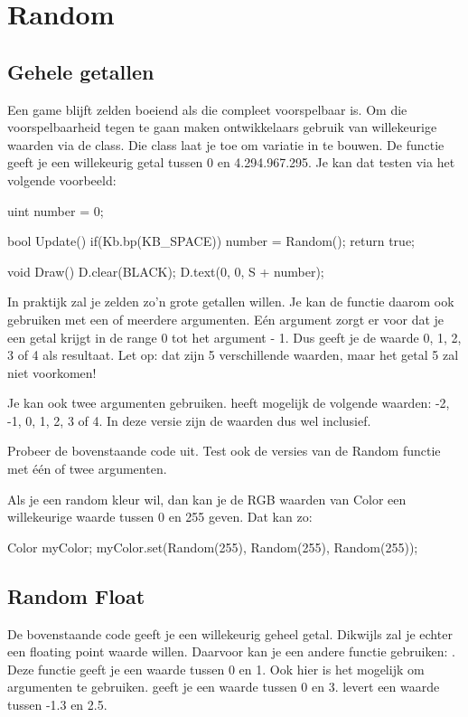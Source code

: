 \chapter{Random}

\section{Gehele getallen}
Een game blijft zelden boeiend als die compleet voorspelbaar is. Om die voorspelbaarheid tegen te gaan maken ontwikkelaars gebruik van willekeurige waarden via de  class. Die class laat je toe om variatie in te bouwen. De functie  geeft je een willekeurig getal tussen 0 en 4.294.967.295. Je kan dat testen via het volgende voorbeeld:

\begin{code}
uint number = 0;

bool Update() {
  if(Kb.bp(KB_SPACE)) number = Random();
	return true;
}

void Draw() {
	D.clear(BLACK);
	D.text(0, 0, S + number);
}
\end{code}

In praktijk zal je zelden zo'n grote getallen willen. Je kan de functie  daarom ook gebruiken met een of meerdere argumenten. E\'en argument zorgt er voor dat je een getal krijgt in de range 0 tot het argument - 1. Dus  geeft je de waarde 0, 1, 2, 3 of 4 als resultaat. Let op: dat zijn 5 verschillende waarden, maar het getal 5 zal niet voorkomen!

Je kan ook twee argumenten gebruiken.  heeft mogelijk de volgende waarden: -2, -1, 0, 1, 2, 3 of 4. In deze versie zijn de waarden dus wel inclusief.

\begin{exercise}
Probeer de bovenstaande code uit. Test ook de versies van de Random functie met \'e\'en of twee argumenten.
\end{exercise}

\begin{note}
Als je een random kleur wil, dan kan je de RGB waarden van Color een willekeurige waarde tussen 0 en 255 geven. Dat kan zo:

\begin{code}
Color myColor;
myColor.set(Random(255), Random(255), Random(255));
\end{code}
\end{note}

\section{Random Float}
De bovenstaande code geeft je een willekeurig geheel getal. Dikwijls zal je echter een floating point waarde willen. Daarvoor kan je een andere functie gebruiken: . Deze functie geeft je een waarde tussen 0 en 1. Ook hier is het mogelijk om argumenten te gebruiken.  geeft je een waarde tussen 0 en 3.  levert een waarde tussen -1.3 en 2.5.

